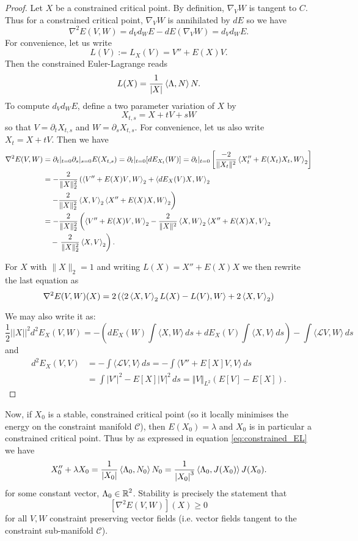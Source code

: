 \documentclass[12pt]{article}
\begin{document}
\begin{proof}
Let \(X\) be a constrained critical point. By definition, \(\nabla_V W\) is tangent to \(C\). Thus for a constrained critical point, \(\nabla_V W\)  is annihilated by \(dE\) so we have
\[
\nabla^2 E(V, W) = d_V d_W E - dE(\nabla_V W) = d_V d_W E.
\]
For convenience, let us write
\[
L(V) := L_X (V) = V'' + E(X) V.
\]
Then the constrained Euler-Lagrange  reads
\[
L(X) = \frac{1}{|X|}\left\langle{\Lambda},{N}\right\rangle N.
\]
To compute \(d_V d_W E\), define a two parameter variation of \(X\) by
\[
X_{t,s} = X + tV + s W
\]
so that \(V = \partial_t X_{t, s}\) and \(W = \partial_s X_{t,s}\). For convenience, let us also write \(X_t = X + tV\). Then we have
\[
\begin{split}
\nabla^2 E(V, W) &= \partial_t|_{t=0} \partial_s|_{s=0} E(X_{t,s}) = \partial_t|_{t=0} [dE_{X_t} (W)] = \partial_t|_{t=0} \left[\frac{-2}{\|X_t\|^2} \left\langle{X_t'' + E(X_t) X_t},{W}\right\rangle_2\right] \\
&= -\frac{2}{\|X\|_2^2} \left(\left\langle{V'' + E(X) V},{W}\right\rangle_2 + \left\langle{dE_X (V)X},{W}\right\rangle_2 \right. \\
&\quad \left. - \frac{2}{\|X\|_2^2} \left\langle{X},{V}\right\rangle_2 \left\langle{X'' + E(X) X},{W}\right\rangle_2 \right) \\
&= -\frac{2}{\|X\|_2^2} \left(\left\langle{V'' + E(X) V},{W}\right\rangle_2 - \frac{2}{\|X\|^2} \left\langle{X},{W}\right\rangle_2 \left\langle{X'' + E(X) X},{V}\right\rangle_2 \right. \\
&\quad - \left. \frac{2}{\|X\|_2^2} \left\langle{X},{V}\right\rangle_2 \right).
\end{split}
\]

For \(X\) with \(\|X\|_2 = 1\) and writing \(L(X) = X'' + E(X) X\) we then rewrite the last equation as
\[
\nabla^2 E(V, W) (X) = 2\left(\left\langle{2\ensuremath{\left\langle{X},{V}\right\rangle}_2 L(X) - L(V)},{W}\right\rangle + 2\left\langle{X},{V}\right\rangle_2\right)
\]

We may also write it as:
\[
\frac12    ||X||^2    d^2 E_X(V,W)
= - \left( dE_X(W)\int \langle X,W \rangle \,ds + dE_X(V)\int \langle X,V \rangle \,ds \right)
-  \int \langle \mathcal{L} V, W \rangle  \,ds
\]
and
\begin{align*}d^2E_X(V,V)&=-\int\langle\mathcal{L}V, V\rangle \,ds= -\int\langle V''+ E[X]V, V\rangle \,ds\\&=  \int| V'|^2- E[X]|V|^2\,ds= \Vert V\Vert_{L^2}\left( E[V]-E[X]\right).
\end{align*}

\end{proof}

Now, if \(X_0\) is a stable, constrained critical point (so it locally minimises the energy on the constraint manifold \(\mathcal{C}\)), then \(E(X_0) = \lambda\) and \(X_0\) is in particular a constrained critical point. Thus by  as expressed in equation \eqref{eq:constrained_EL} we have
\[
X_0'' + \lambda X_0 = \frac{1}{\left|{X_0}\right|} \left\langle{\Lambda_0},{N_0}\right\rangle N_0 = \frac{1}{\left|{X_0}\right|^3} \left\langle{\Lambda_0},{J(X_0)}\right\rangle J(X_0).
\]
for some constant vector, \(\Lambda_0 \in \operatorname{\mathbb{R}}^2\). Stability is precisely the statement that
\begin{equation}
\label{eq:hessian_minimiser_positive}
[\nabla^2 E(V, W)] (X) \geq 0
\end{equation}
for all \(V, W\) constraint preserving vector fields (i.e. vector fields tangent to the constraint sub-manifold \(\mathcal{C}\)).
\end{document}
